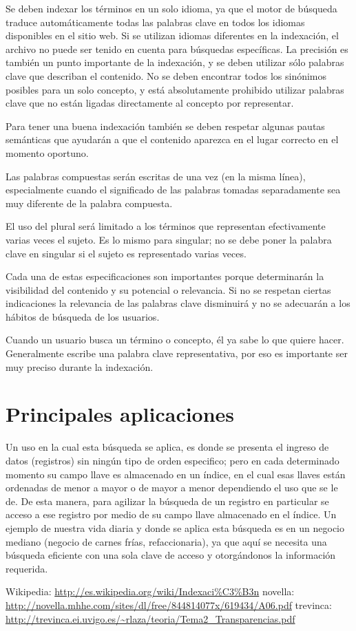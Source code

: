 \documentclass[11pt,a4paper]{article}
\begin{document}
Se deben indexar los términos en un solo idioma, ya que el motor de búsqueda traduce automáticamente todas las palabras clave en todos los idiomas disponibles en el sitio web. Si se utilizan idiomas diferentes en la indexación, el archivo no puede ser tenido en cuenta para búsquedas específicas. La precisión es también un punto importante de la indexación, y se deben utilizar sólo palabras clave que describan el contenido. No se deben encontrar todos los sinónimos posibles para un solo concepto, y está absolutamente prohibido utilizar palabras clave que no están ligadas directamente al concepto por representar.

Para tener una buena indexación también se deben respetar algunas pautas semánticas que ayudarán a que el contenido aparezca en el lugar correcto en el momento oportuno.

Las palabras compuestas serán escritas de una vez (en la misma línea), especialmente cuando el significado de las palabras tomadas separadamente sea muy diferente de la palabra compuesta.

El uso del plural será limitado a los términos que representan efectivamente varias veces el sujeto. Es lo mismo para singular; no se debe poner la palabra clave en singular si el sujeto es representado varias veces.

Cada una de estas especificaciones son importantes porque determinarán la visibilidad del contenido y su potencial o relevancia. Si no se respetan ciertas indicaciones la relevancia de las palabras clave disminuirá y no se adecuarán a los hábitos de búsqueda de los usuarios.

Cuando un usuario busca un término o concepto, él ya sabe lo que quiere hacer. Generalmente escribe una palabra clave representativa, por eso es importante ser muy preciso durante la indexación.


\section{Principales aplicaciones}
Un uso en la cual esta búsqueda se aplica, es donde se presenta el ingreso de datos (registros) sin ningún tipo de orden especifico; pero en cada determinado momento su campo llave es almacenado en un índice, en el cual esas llaves están ordenadas de menor a mayor o de mayor a menor dependiendo el uso que se le de. De esta manera, para agilizar la búsqueda de un registro en particular se acceso a ese registro por medio de su campo llave almacenado en el índice.
Un ejemplo de nuestra vida diaria y donde se aplica esta búsqueda es en un negocio mediano (negocio de carnes frías, refaccionaria), ya que aquí se necesita una búsqueda eficiente con una sola clave de acceso y otorgándonos la información requerida.


\begin{thebibliography}{03}
 Wikipedia: \url{http://es.wikipedia.org/wiki/Indexaci%C3%B3n}
 novella: \url{http://novella.mhhe.com/sites/dl/free/844814077x/619434/A06.pdf}
 trevinca: \url{http://trevinca.ei.uvigo.es/~rlaza/teoria/Tema2_Transparencias.pdf}

\end{thebibliography}
\end{document}
